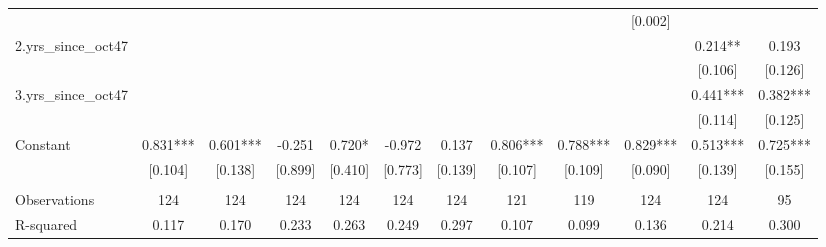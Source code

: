 \documentclass[landscape]{article}
\begin{document}
\begin{tabular}{lccccccccccc}
 &  &  &  &  &  &  &  &  & [0.002] &  &  \\
2.yrs\_since\_oct47 &  &  &  &  &  &  &  &  &  & 0.214** & 0.193 \\
 &  &  &  &  &  &  &  &  &  & [0.106] & [0.126] \\
3.yrs\_since\_oct47 &  &  &  &  &  &  &  &  &  & 0.441*** & 0.382*** \\
 &  &  &  &  &  &  &  &  &  & [0.114] & [0.125] \\
Constant & 0.831*** & 0.601*** & -0.251 & 0.720* & -0.972 & 0.137 & 0.806*** & 0.788*** & 0.829*** & 0.513*** & 0.725*** \\
 & [0.104] & [0.138] & [0.899] & [0.410] & [0.773] & [0.139] & [0.107] & [0.109] & [0.090] & [0.139] & [0.155] \\
 &  &  &  &  &  &  &  &  &  &  &  \\
Observations & 124 & 124 & 124 & 124 & 124 & 124 & 121 & 119 & 124 & 124 & 95 \\
 R-squared & 0.117 & 0.170 & 0.233 & 0.263 & 0.249 & 0.297 & 0.107 & 0.099 & 0.136 & 0.214 & 0.300 \\ \hline
\end{tabular}
\end{document}
